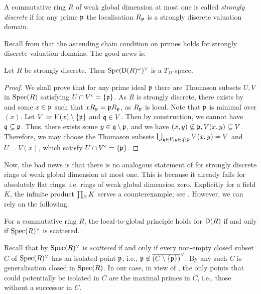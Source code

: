 \documentclass[reqno,a4paper]{amsart}
\begin{document}
\begin{definition}\label{def:strongp}
    A commutative ring $R$ of weak global dimension at most one is called {\it strongly discrete} if for any prime $\mathfrak{p}$ the localisation $R_{\mathfrak{p}}$ is a strongly discrete valuation domain. 
\end{definition}
Recall from  that the ascending chain condition on primes holds for strongly discrete valuation domains.
The good news is:
\begin{lemma}\label{lem:weaklynoethprüfer}
Let $R$ be strongly discrete. Then $\operatorname{Spc}(\mathsf{D}(R)^\omega)^\vee$ is a $T_D$-space.
\end{lemma}
\begin{proof}
    We shall prove that for any prime ideal $\mathfrak{p}$ there are Thomason subsets $U,V$ in $\operatorname{Spec}(R)$ satisfying $U\cap V^c=\{\mathfrak{p}\}$.
    As $R$ is strongly discrete, there exists by  and   some $x\in \mathfrak{p}$ such that $x R_{\mathfrak{p}}=\mathfrak{p} R_{\mathfrak{p}}$, as $R_{\mathfrak{p}}$ is local. Note that $\mathfrak{p}$ is minimal over $(x)$. Let $V\coloneqq V(x)\setminus\{\mathfrak{p}\}$ and $\mathfrak{q}\in V$. Then by construction, we cannot have $\mathfrak{q}\subsetneq \mathfrak{p}$. Thus, there exists some $y\in\mathfrak{q}\setminus\mathfrak{p}$, and we have $(x,y)\not\subseteq \mathfrak{p}, V(x,y)\subseteq V$. Therefore, we may choose the Thomason subsets $\bigcup_{\mathfrak{q}\in V,y\in\mathfrak{q}\setminus\mathfrak{p}}V(x,y)=V$ and $U=V(x)$, which satisfy $U\cap V^c=\{\mathfrak{p}\}$.
%
\end{proof}
Now, the bad news is that there is no analogous statement of  for strongly discrete rings of weak global dimension at most one.
This is because it already fails for absolutely flat rings, i.e. rings of weak global dimension zero. Explicitly for a field $K$, the infinite product $\prod_{\mathbb{N}} K$ serves a counterexample; see \cite[Example 4.13]{stevenson_absolutelyflatrings}. However, we can rely on the following.
\begin{theorem}\label{thm:scattered}
    For a commutative ring $R$, the local-to-global principle holds for $\mathsf{D}(R)$ if and only if $\operatorname{Spec}(R)^\vee$ is scattered.
\end{theorem}
\begin{remark}\label{rem:onlycusps}
    Recall that by \cite[Lemma 7.3]{isolated} $\operatorname{Spec}(R)^\vee$ is \emph{scattered} if and only if every non-empty closed subset $C$ of $\operatorname{Spec}(R)^\vee$ has an isolated point $\mathfrak{p}$, i.e., $\mathfrak{p}\not\in\overline{(C\setminus\{\mathfrak{p}\})}^{\vee}$. By \cite[Corollary 4.1.6]{dst19} any such $C$ is generalisation closed in $\operatorname{Spec}(R)$. In our case, in view of , the only points that could potentially be isolated in $C$ are the maximal primes in $C$, i.e., those without a successor in $C$. 
\end{remark}
\end{document}
